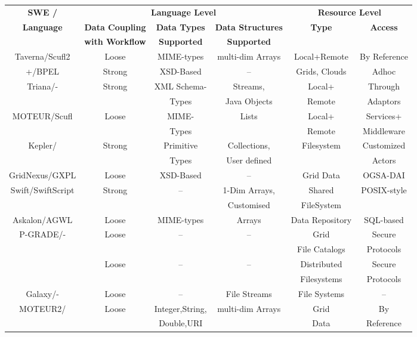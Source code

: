 \begin{table}[ht!]
\begin{center}
\hspace*{-2.2cm}
\begin{tabular}{|c|c|c|c|c|c|}
\hline
\textbf{SWE /} & \multicolumn{3}{c|}{\textbf{Language Level}} & \multicolumn{2}{c|}{\textbf{Resource Level}}\\
\cline{2-6}
\multirow{2}{*}{\textbf{Language}} & \textbf{Data Coupling} & \textbf{Data Types} & \textbf{Data Structures} & \textbf{Type} & \textbf{Access}\\
& \textbf{with Workflow} & \textbf{Supported} & \textbf{Supported} & & \\
\hline
Taverna/Scufl2&Loose&MIME-types&multi-dim Arrays&Local+Remote&By Reference\\\hline
+/BPEL&Strong&XSD-Based&--&Grids, Clouds& Adhoc\\\hline
%
\multirow{2}{*}{Triana/-}&Strong&XML Schema-&Streams,&Local+&Through \\
&&Types&Java Objects&Remote&Adaptors\\\hline
%
\multirow{2}{*}{MOTEUR/Scufl}&Loose&MIME-&Lists&Local+&Services+\\
&&Types&&Remote&Middleware\\\hline
% 
\multirow{2}{*}{Kepler/}&Strong&Primitive&Collections,&Filesystem&Customized\\
MoML&&Types&User defined&&Actors\\\hline
% 
GridNexus/GXPL&Loose&XSD-Based&--&Grid Data&OGSA-DAI \\\hline
% 
\multirow{2}{*}{Swift/SwiftScript} &Strong&--&1-Dim Arrays,&Shared& POSIX-style\\
&&&Customised&FileSystem&\\\hline
% 
Askalon/AGWL&Loose&MIME-types&Arrays&Data Repository&SQL-based\\\hline
%
\multirow{2}{*}{P-GRADE/-}&Loose&--&--&Grid&Secure\\
&&&&File Catalogs&Protocols\\\hline
%
\multirow{2}{*}{}Pegasus/&Loose&--&--&Distributed&Secure\\
DAX&&&&Filesystems&Protocols\\\hline
% 
Galaxy/-&Loose&--&File Streams&File Systems&--\\\hline
% 
\multirow{2}{*}{MOTEUR2/} &Loose&Integer,String,&multi-dim Arrays&Grid&By\\
Gwendia~ &&Double,URI&&Data&Reference\\\hline
\end{tabular}
\label{tbl:datadesc}
\end{center}
\end{table}

